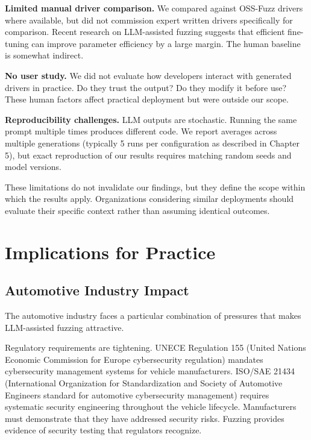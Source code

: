 \textbf{Limited manual driver comparison.} We compared against OSS-Fuzz drivers where available, but did not commission expert written drivers specifically for comparison. Recent research on LLM-assisted fuzzing \cite{efficient_finetuning} suggests that efficient fine-tuning can improve parameter efficiency by a large margin. The human baseline is somewhat indirect.

\textbf{No user study.} We did not evaluate how developers interact with generated drivers in practice. Do they trust the output? Do they modify it before use? These human factors affect practical deployment but were outside our scope.

\textbf{Reproducibility challenges.} LLM outputs are stochastic. Running the same prompt multiple times produces different code. We report averages across multiple generations (typically 5 runs per configuration as described in Chapter 5), but exact reproduction of our results requires matching random seeds and model versions.

These limitations do not invalidate our findings, but they define the scope within which the results apply. Organizations considering similar deployments should evaluate their specific context rather than assuming identical outcomes.


\section{Implications for Practice}
\label{sec:discussion_implications}

\subsection{Automotive Industry Impact}
\label{sec:discussion_automotive}

The automotive industry faces a particular combination of pressures that makes LLM-assisted fuzzing attractive.

Regulatory requirements are tightening. UNECE Regulation 155 \cite{UNECER155} (United Nations Economic Commission for Europe cybersecurity regulation) mandates cybersecurity management systems for vehicle manufacturers. ISO/SAE 21434 \cite{ISO21434} (International Organization for Standardization and Society of Automotive Engineers standard for automotive cybersecurity management) requires systematic security engineering throughout the vehicle lifecycle. Manufacturers must demonstrate that they have addressed security risks. Fuzzing provides evidence of security testing that regulators recognize.

